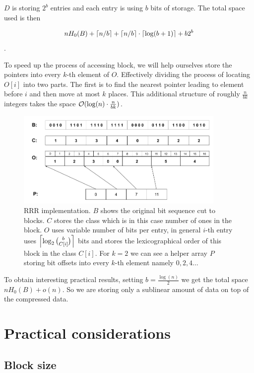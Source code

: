 $D$ is storing $2^b$ entries and each entry is using $b$ bits of storage.
The total space used is then

$$nH_0(B) + \left\lceil n/b \right\rceil + \left\lceil n/b \right\rceil \cdot \left\lceil \log(b+1) \right\rceil + b2^b$$.

To speed up the process of accessing block, we will help ourselves store the pointers
into every $k$-th element of $O$. Effectively dividing the process of locating $O[i]$ into two
parts. The first is to find the nearest pointer leading to element before $i$ and
then move at most $k$ places. This additional structure of roughly $\frac{n}{bk}$ integers
takes the space $\mathcal{O}(\log(n)\cdot \frac{n}{bk})$.

\begin{figure}
	\centerline{
		\includegraphics[width=0.9\textwidth, height=0.3\textheight]{images/rrr}
	}
	\caption[TODO]{RRR implementation. $B$ shows the original bit sequence cut to
    blocks. $C$ stores the class which is in this case number of ones in the block.
    $O$ uses variable number of bits per entry, in general $i$-th entry uses
    $\left\lceil \log_2{b\choose C[i]} \right\rceil$ bits and stores the lexicographical order
    of this block in the class $C[i]$. For $k=2$ we can see a helper array $P$
    storing bit offsets into every $k$-th element namely $0, 2, 4\ldots$
	}
	\label{obr:RRRFinal}
\end{figure}

To obtain interesting practical results, setting $b=\frac{\log(n)}{2}$ we get the total space
$nH_0(B) + o(n)$. So we are storing only a sublinear amount of data on top of the compressed
data.

\section{Practical considerations}

\subsection{Block size}

